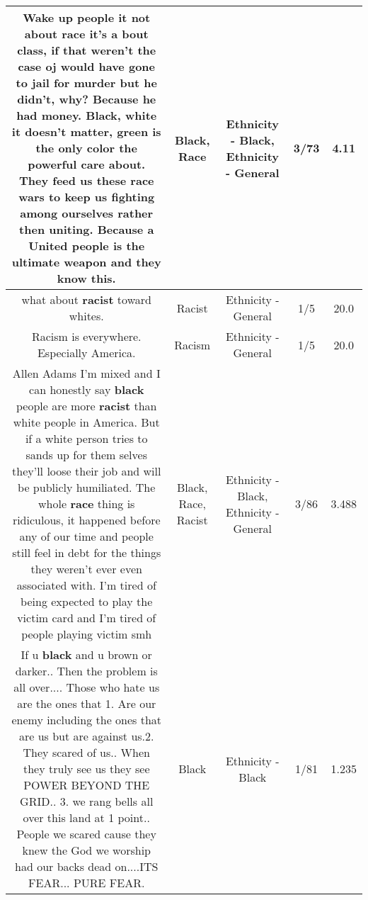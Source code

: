 \documentclass[11pt]{article}
\newlength\mylength
\begin{document}
\begin{center}
\begin{longtable}{|C{.65\mylength}|C{.30\mylength}|C{.12\mylength}|C{.12\mylength}|C{.12\mylength}|}
  \small Wake up people it not about \textbf{race} it's a bout class, if that weren't the case oj would have gone to jail for murder but he didn't, why? Because he had money. \textbf{Black}, white it doesn't matter, green is the only color the powerful care about. They feed us these \textbf{race} wars to keep us fighting among ourselves rather then uniting. Because a United people is the ultimate weapon and they know this.\normalsize   & Black, Race & Ethnicity - Black, Ethnicity - General & 3/73 & 4.11 \\  \hline
  \small what about \textbf{racist} toward whites.\normalsize   & Racist & Ethnicity - General & 1/5 & 20.0 \\  \hline
  \small Racism is everywhere. Especially America.\normalsize   & Racism & Ethnicity - General & 1/5 & 20.0 \\  \hline
  \small Allen Adams I'm mixed and I can honestly say \textbf{black} people are more \textbf{racist} than white people in America. But if a white person tries to sands up for them selves they'll loose their job and will be publicly humiliated. The whole \textbf{race} thing is ridiculous, it happened before any of our time and people still feel in debt for the things they weren't ever even associated with. I'm tired of being expected to play the victim card and I'm tired of people playing victim smh\normalsize   & Black, Race, Racist & Ethnicity - Black, Ethnicity - General & 3/86 & 3.488 \\  \hline
  \small If u \textbf{black} and u brown or darker.. Then the problem is all over.... Those who hate us are the ones that 1. Are our enemy including the ones that are us but are against us.2. They scared of us.. When they truly see us they see POWER BEYOND THE GRID.. 3. we rang bells all over this land at 1 point.. People we scared cause they knew the God we worship had our backs dead on....ITS FEAR... PURE FEAR.\normalsize   & Black & Ethnicity - Black & 1/81 & 1.235 \\  \hline

\end{longtable}
\end{center}
\end{document}
